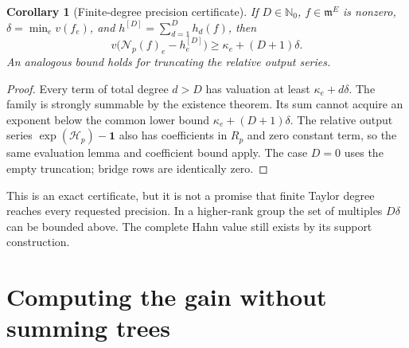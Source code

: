 \documentclass[11pt,a4paper]{article}
\numberwithin{equation}{section}
\newtheorem{corollary}[theorem]{Corollary}
\theoremstyle{definition}
\newcommand{\N}{\mathbb N}
\newcommand{\mm}{\mathfrak m}
\newcommand{\NN}{\mathcal N}
\begin{document}
\begin{corollary}[Finite-degree precision certificate]
\label{scale:cor:remainder}
If $D\in\N_0$, $f\in\mm^E$ is nonzero, $\delta=\min_e v(f_e)$, and
$h^{[D]}=\sum_{d=1}^D h_d(f)$, then
\begin{equation}\label{scale:eq:remainder}
 v\bigl(\NN_p(f)_e-h^{[D]}_e\bigr)
 \geq\kappa_e+(D+1)\delta.
\end{equation}
An analogous bound holds for truncating the relative output series.
\end{corollary}
\begin{proof}
Every term of total degree $d>D$ has valuation at least
$\kappa_e+d\delta$. The family is strongly summable by the existence
theorem. Its sum cannot acquire an exponent below the common lower
bound $\kappa_e+(D+1)\delta$. The relative output series
$\exp(\mathcal H_p)-\mathbf1$ also has coefficients in $R_p$ and zero
constant term, so the same evaluation lemma and coefficient bound apply.
The case $D=0$ uses the empty truncation; bridge rows are identically zero.
\end{proof}
This is an exact certificate, but it is not a promise that finite
Taylor degree reaches every requested precision. In a higher-rank
group the set of multiples $D\delta$ can be bounded above.
The complete Hahn value still exists by its support construction.

\section{Computing the gain without summing trees}\label{scale:sec:bottleneck}
\end{document}

